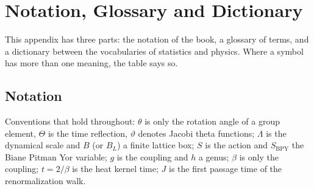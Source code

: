 \chapter{Notation, Glossary and Dictionary}\label{ch:notation}

This appendix has three parts: the notation of the book, a glossary of terms, and a dictionary between the vocabularies of statistics and physics. Where a symbol has more than one meaning, the table says so.

\section{Notation}

Conventions that hold throughout: $\theta$ is only the rotation angle of a group element, $\Theta$ is the time reflection, $\vartheta$ denotes Jacobi theta functions; $\Lambda$ is the dynamical scale and $B$ (or $B_L$) a finite lattice box; $S$ is the action and $S_{\mathrm{BPY}}$ the Biane Pitman Yor variable; $g$ is the coupling and $h$ a genus; $\beta$ is only the coupling; $t=2/\beta$ is the heat kernel time; $J$ is the first passage time of the renormalization walk.


